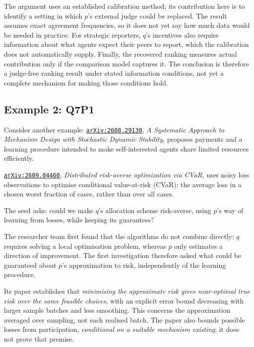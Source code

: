 \documentclass[11pt,a4paper]{article}
\renewenvironment{quote}{\tcolorbox[pairpanel]}{\endtcolorbox}
\newcommand{\pl}[1]{\noindent\llap{\makebox[1.5em][l]{\color{accent}\(#1\)}}}
\newcommand{\file}[1]{\texttt{#1}}
\begin{document}
The argument uses an established calibration method; its contribution here is to
identify a setting in which \(p\)'s external judge could be replaced. The result
assumes exact agreement frequencies, so it does not yet say how much data would
be needed in practice. For strategic reporters, \(q\)'s incentives also require
information about what agents expect their peers to report, which the
calibration does not automatically supply. Finally, the recovered ranking
measures actual contribution only if the comparison model captures it. The
conclusion is therefore a judge-free ranking result under stated information
conditions, not yet a complete mechanism for making those conditions hold.

\subsection{Example 2: Q7P1}
Consider another example:
\begin{quote}
\pl{q}\href{https://arxiv.org/abs/2608.29130}{\file{arXiv:2608.29130}}, \emph{A
Systematic Approach to Mechanism Design with Stochastic Dynamic Stability},
proposes payments and a learning procedure intended to make self-interested
agents share limited resources efficiently.

\pl{p}\href{https://arxiv.org/abs/2609.04460}{\file{arXiv:2609.04460}},
\emph{Distributed risk-averse optimization via CVaR}, uses noisy loss
observations to optimise conditional value-at-risk (CVaR): the average loss in a
chosen worst fraction of cases, rather than over all cases.

The seed asks: could we make \(q\)'s allocation scheme risk-averse, using
\(p\)'s way of learning from losses, while keeping its guarantees?
\end{quote}

The researcher team first found that the algorithms do not combine directly:
\(q\) requires solving a local optimisation problem, whereas \(p\) only
estimates a direction of improvement. The first investigation therefore asked
what could be guaranteed about \(p\)'s approximation to risk, independently of
the learning procedure.

Its paper establishes that \emph{minimising the approximate risk gives
near-optimal true risk over the same feasible choices}, with an explicit error
bound decreasing with larger sample batches and less smoothing. This concerns
the approximation averaged over sampling, not each realised batch. The paper
also bounds possible losses from participation, \emph{conditional on a suitable
mechanism existing}; it does not prove that premise.
\end{document}
